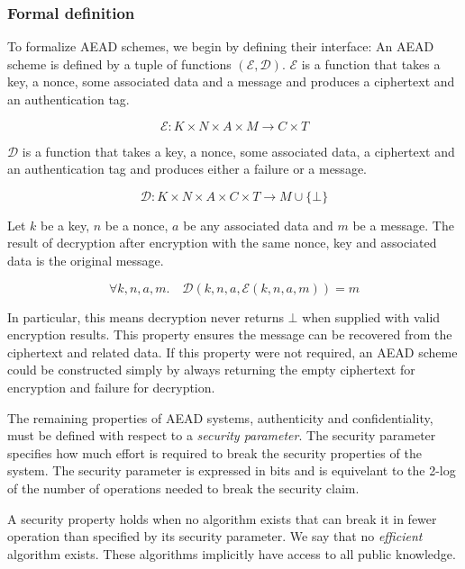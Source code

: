 \subsubsection{Formal definition}

To formalize AEAD schemes, we begin by defining their interface: An AEAD scheme
is defined by a tuple of functions $(\mathcal{E}, \mathcal{D})$. $\mathcal{E}$
is a function that takes a key, a nonce, some associated data and a message and
produces a ciphertext and an authentication tag.

\begin{equation}
    \mathcal{E} : K \times N \times A \times M \to C \times T
\end{equation}

$\mathcal{D}$ is a function that takes a key, a nonce, some associated data, a
ciphertext and an authentication tag and produces either a failure or a message.

\begin{equation}
    \mathcal{D} : K \times N \times A \times C \times T \to M \cup \{ \bot \}
\end{equation}

Let $k$ be a key, $n$ be a nonce, $a$ be any associated data and $m$ be a
message. The result of decryption after encryption with the same nonce, key and
associated data is the original message.

\begin{equation}
    \forall k, n, a, m.\quad \mathcal{D}(k, n, a, \mathcal{E}(k, n, a, m)) = m
\end{equation}

In particular, this means decryption never returns $\bot$ when supplied with
valid encryption results. This property ensures the message can be recovered
from the ciphertext and related data. If this property were not required, an
AEAD scheme could be constructed simply by always returning the empty ciphertext
for encryption and failure for decryption.

The remaining properties of AEAD systems, authenticity and confidentiality, must
be defined with respect to a \emph{security parameter}. The security parameter
specifies how much effort is required to break the security properties of the
system. The security parameter is expressed in bits and is equivelant to the
2-log of the number of operations needed to break the security claim.

A security property holds when no algorithm exists that can break it in fewer
operation than specified by its security parameter. We say that no
\emph{efficient} algorithm exists. These algorithms implicitly have access to
all public knowledge.

